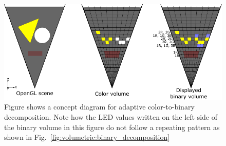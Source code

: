 \begin{figure}[!htb]
\centering
\includegraphics[width=0.99\columnwidth]{images/volumetric/adaptive_color_decomposition}
\caption[Volumetric NED: Motivation for adaptive color-to-binary decomposition]{Figure shows a concept diagram for adaptive color-to-binary decomposition. Note how the LED values written on the left side of the binary volume in this figure do not follow a repeating pattern as shown in Fig.~\ref{fig:volumetric:binary_decomposition}}
\label{fig:volumetric:acd}
\end{figure}

